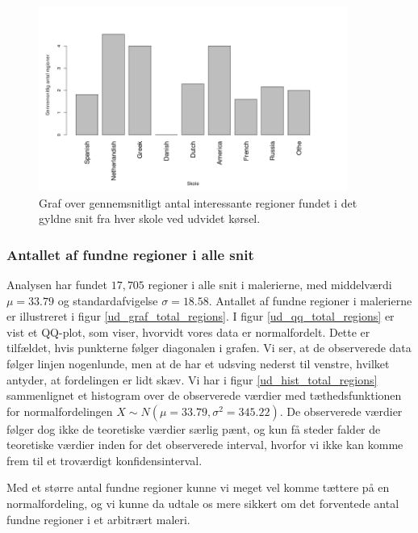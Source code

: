 {\begin{figure}[!h]
	\begin{center}
		\includegraphics[angle=0,width=0.90\textwidth]{afsnit/resultater/billeder/nationcutU.png}
	\end{center}
    \caption{Graf over gennemsnitligt antal interessante regioner fundet
    i det gyldne snit fra hver skole ved udvidet kørsel.}
	\label{udvidet_nation}
\end{figure}

\subsubsection{Antallet af fundne regioner i alle snit}
Analysen har fundet $17,705$ regioner i alle snit i malerierne, med
middelværdi $\mu = 33.79$ og standardafvigelse $\sigma = 18.58$.
Antallet af fundne regioner i malerierne er illustreret i figur
\ref{ud_graf_total_regions}. I figur \ref{ud_qq_total_regions} er vist
et QQ-plot, som viser, hvorvidt vores data er normalfordelt. Dette er
tilfældet, hvis punkterne følger diagonalen i grafen. Vi ser, at de
observerede data følger linjen nogenlunde, men at de har et udsving nederst
til venstre, hvilket antyder, at fordelingen er lidt skæv. Vi har i figur
\ref{ud_hist_total_regions} sammenlignet et histogram over de
observerede værdier med tæthedsfunktionen for normalfordelingen $X \sim
N(\mu = 33.79, \sigma^2 = 345.22)$. De observerede værdier følger dog
ikke de teoretiske værdier særlig pænt, og kun få steder falder de
teoretiske værdier inden for det observerede interval, hvorfor vi ikke
kan komme frem til et troværdigt konfidensinterval.

Med et større antal fundne regioner kunne vi meget vel komme tættere på
en normalfordeling, og vi kunne da udtale os mere sikkert om det
forventede antal fundne regioner i et arbitrært maleri.

}
